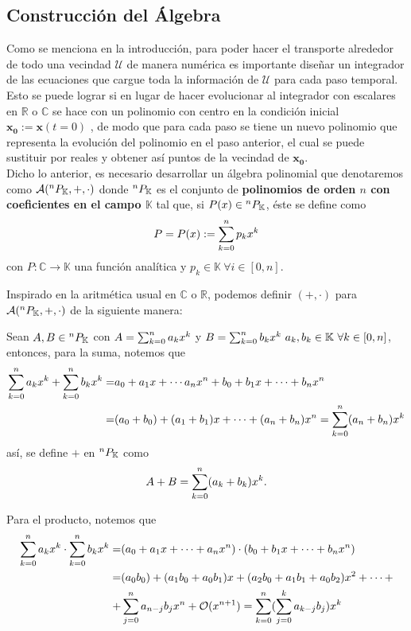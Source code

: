\subsection{Construcción del Álgebra}

Como se menciona en la introducción, para poder hacer el transporte alrededor de todo una vecindad $\mathcal{U}$ de manera numérica es importante diseñar un integrador de las ecuaciones que cargue toda la información de $\mathcal{U}$ para cada paso temporal. Esto se puede lograr si en lugar de hacer evolucionar al integrador con escalares en $\mathbb{R}$ o $\mathbb{C}$ se hace con un polinomio con centro en la condición inicial $\mathbf{x_0} := \mathbf{x}(t=0)$ , de modo que para cada paso se tiene un nuevo polinomio que representa la evolución del polinomio en el paso anterior, el cual se puede sustituir por reales y obtener así puntos de la vecindad de $\mathbf{x_0}$. \\

Dicho lo anterior, es necesario desarrollar un álgebra polinomial que denotaremos como $\mathcal{A}(^{n}P_{\mathbb{K}},+,\cdot)$ donde ${^{n}P_{\mathbb{K}}}$ es el conjunto de \textbf{polinomios de orden $n$ con coeficientes en el campo $\mathbb{K}$} tal que, si  $P(x) \in {^{n}P_{\mathbb{K}}}$, éste se define como
$$P = P(x) := \sum_{k=0}^n p_k x^k $$
con $P: \mathbb{C} \to \mathbb{K}$ una función analítica y $p_k \in \mathbb{K} \  \forall i \in [0,n]$.



Inspirado en la aritmética usual en $\mathbb{C}$ o $\mathbb{R}$, podemos definir $(+,\cdot)$ para $\mathcal{A}(^{n}P_{\mathbb{K}},+,\cdot)$ de la siguiente manera:

Sean $A,B \in {^{n}P_{\mathbb{K}}}$ con $A = \sum_{k=0}^n a_k x^k$ y $B = \sum_{k=0}^n b_k x^k \ a_k,b_k \in \mathbb{K} \ \forall k \in [0,n]$, entonces, para la suma, notemos que
\begin{align*}
\sum_{k=0}^n a_k x^k + \sum_{k=0}^n b_k x^k =& a_0 + a_1 x + \cdots a_n x^n + b_0 + b_1 x + \cdots + b_n x^n \\
=& (a_0 + b_0) + (a_1 + b_1) x + \cdots + (a_n + b_n)x^n = \sum_{k=0}^n (a_n + b_n) x^k 
\end{align*}
así, se define \textbf{$+$}  en ${^{n}P_{\mathbb{K}}}$ como
\begin{equation}
A + B = \sum_{k=0}^n (a_k + b_k) x^k.
\label{eq: polsum}
\end{equation}

Para el producto, notemos que
\begin{align*}
\sum_{k=0}^n a_k x^k\cdot\sum_{k=0}^n b_k x^k =& (a_0 + a_1 x + \cdots + a_n x^n)\cdot(b_0 + b_1 x + \cdots + b_n x^n) \\
=& (a_0b_0) + (a_1b_0 + a_0b_1) x + (a_2b_0 + a_1b_1 + a_0b_2) x^2 + \cdots + \\
+& \sum_{j=0}^n a_{n-j}b_j x^n + \mathcal{O}(x^{n+1}) = \sum_{k=0}^n  (\sum_{j=0}^k a_{k-j}b_j  )  x^k
\end{align*}

